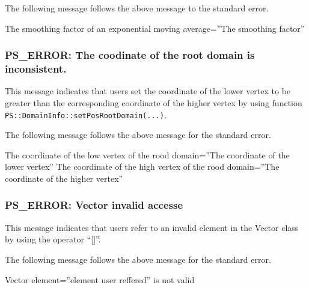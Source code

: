 
The following message follows the above message to the
standard error.
\begin{screen}
  The smoothing factor of an exponential moving average=''The smoothing factor''
\end{screen}

\subsubsection{PS\_ERROR: The coodinate of the root domain is inconsistent.}

This message indicates that users set the coordinate of the lower
vertex to be greater than the corresponding coordinate of the higher
vertex by using function \\ {\tt PS::DomainInfo::setPosRootDomain(...)}.


The following message follows the above message for the standard
error.
\begin{screen}
  The coordinate of the low vertex of the rood domain=''The coordinate of the lower vertex''
  The coordinate of the high vertex of the rood domain=''The coordinate of the higher vertex''  
\end{screen}


\subsubsection{PS\_ERROR: Vector invalid accesse}
\label{sec:errormessage:vector_invalid_access}

This message indicates that users refer to an invalid element in the
Vector class by using the operator ``[]''.

The following message follows the above message for the standard
error.
\begin{screen}
  Vector element=''element user reffered'' is not valid
\end{screen}
